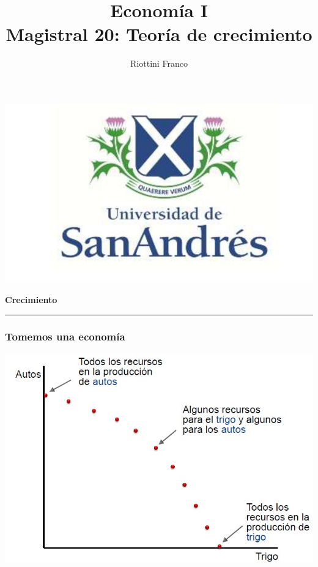 \documentclass{beamer}
\title[Economía I]{Economía I \vspace{4mm}
\\ Magistral 20: Teoría de crecimiento}
\date{}
\author[Riottini]{Riottini Franco}
\institute[]{Universidad de San Andrés}
\begin{document}
\begin{frame}
\titlepage
\centering

\includegraphics[scale=0.2]{../Figures/logoUDESA.jpg} 
\end{frame}

\begin{frame}{}
\centering\huge\textbf{Crecimiento} 
\vspace{2mm}
\hrule
\end{frame}

\begin{frame}
\frametitle{Tomemos una economía}
\begin{center}
    \includegraphics[scale=0.6]{../Tema_11.2_tomemosunaeconomia.jpg}
\end{center}
\end{frame}
\end{document}
